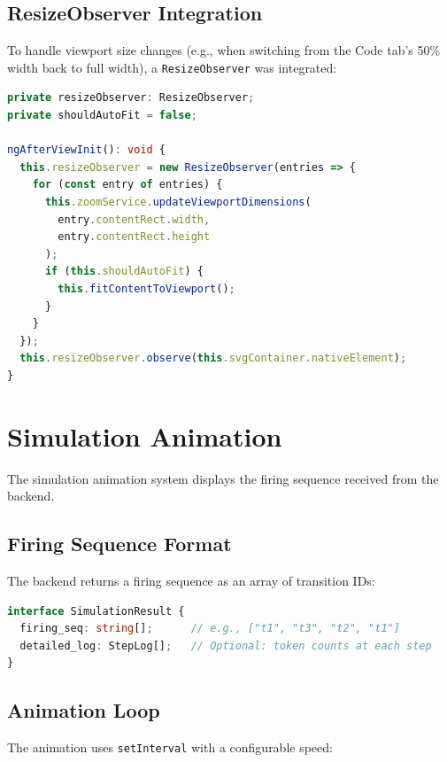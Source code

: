 \subsection{ResizeObserver Integration}

To handle viewport size changes (e.g., when switching from the Code tab's 50\% width back to full width), a \texttt{ResizeObserver} was integrated:

\begin{lstlisting}[language=TypeScript, caption={ResizeObserver setup for responsive viewport}]
private resizeObserver: ResizeObserver;
private shouldAutoFit = false;

ngAfterViewInit(): void {
  this.resizeObserver = new ResizeObserver(entries => {
    for (const entry of entries) {
      this.zoomService.updateViewportDimensions(
        entry.contentRect.width,
        entry.contentRect.height
      );
      if (this.shouldAutoFit) {
        this.fitContentToViewport();
      }
    }
  });
  this.resizeObserver.observe(this.svgContainer.nativeElement);
}
\end{lstlisting}

\section{Simulation Animation}
\label{sec:simulation-animation}

The simulation animation system displays the firing sequence received from the backend.

\subsection{Firing Sequence Format}

The backend returns a firing sequence as an array of transition IDs:

\begin{lstlisting}[language=TypeScript, caption={Firing sequence data structure}]
interface SimulationResult {
  firing_seq: string[];      // e.g., ["t1", "t3", "t2", "t1"]
  detailed_log: StepLog[];   // Optional: token counts at each step
}
\end{lstlisting}

\subsection{Animation Loop}

The animation uses \texttt{setInterval} with a configurable speed:


